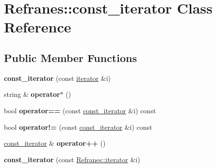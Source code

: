 \hypertarget{class_refranes_1_1const__iterator}{}\section{Refranes\+:\+:const\+\_\+iterator Class Reference}
\label{class_refranes_1_1const__iterator}
\subsection*{Public Member Functions}
\begin{DoxyCompactItemize}
\item 
{\bfseries const\+\_\+iterator} (const \hyperlink{class_refranes_1_1iterator}{iterator} \&i)\hypertarget{class_refranes_1_1const__iterator_a5b7ff2dcd9a64ecde1f2f0dbfb8de6d2}{}\label{class_refranes_1_1const__iterator_a5b7ff2dcd9a64ecde1f2f0dbfb8de6d2}

\item 
string \& {\bfseries operator$\ast$} ()\hypertarget{class_refranes_1_1const__iterator_a4e64342f8153486e84d38078a209c26e}{}\label{class_refranes_1_1const__iterator_a4e64342f8153486e84d38078a209c26e}

\item 
bool {\bfseries operator==} (const \hyperlink{class_refranes_1_1const__iterator}{const\+\_\+iterator} \&i) const \hypertarget{class_refranes_1_1const__iterator_af40caead80faac67fe4cffdfd4fce7d9}{}\label{class_refranes_1_1const__iterator_af40caead80faac67fe4cffdfd4fce7d9}

\item 
bool {\bfseries operator!=} (const \hyperlink{class_refranes_1_1const__iterator}{const\+\_\+iterator} \&i) const \hypertarget{class_refranes_1_1const__iterator_a353952aed4bb3f4ebfe3e851ff6922a7}{}\label{class_refranes_1_1const__iterator_a353952aed4bb3f4ebfe3e851ff6922a7}

\item 
\hyperlink{class_refranes_1_1const__iterator}{const\+\_\+iterator} \& {\bfseries operator++} ()\hypertarget{class_refranes_1_1const__iterator_a1c5db7810f0fcb002cae1bade2756296}{}\label{class_refranes_1_1const__iterator_a1c5db7810f0fcb002cae1bade2756296}

\item 
{\bfseries const\+\_\+iterator} (const \hyperlink{class_refranes_1_1iterator}{Refranes\+::iterator} \&i)\hypertarget{class_refranes_1_1const__iterator_a880a41d92b7a34c0ac9c3c9b8f2acb4a}{}\label{class_refranes_1_1const__iterator_a880a41d92b7a34c0ac9c3c9b8f2acb4a}


\end{DoxyCompactItemize}
